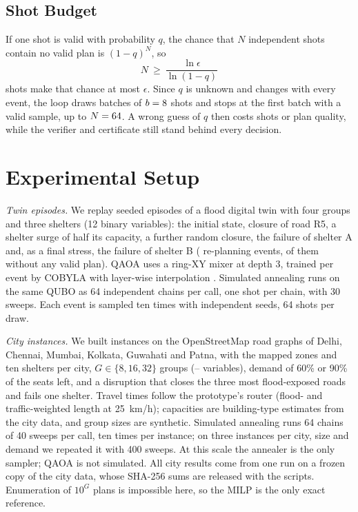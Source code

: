 \documentclass[conference]{IEEEtran}
\begin{document}
\subsection{Shot Budget}
If one shot is valid with probability $q$, the chance that $N$ independent shots contain no valid plan is $(1-q)^N$, so
\begin{equation}
N\ \ge\ \frac{\ln\epsilon}{\ln(1-q)}
\label{eq:shots}
\end{equation}
shots make that chance at most $\epsilon$. Since $q$ is unknown and changes with every event, the loop draws batches of $b=8$ shots and stops at the first batch with a valid sample, up to $N=64$. A wrong guess of $q$ then costs shots or plan quality, while the verifier and certificate still stand behind every decision.

\section{Experimental Setup}
\textit{Twin episodes.} We replay \TwinSeeds{} seeded episodes of a flood digital twin with four groups and three shelters (12 binary variables): the initial state, closure of road R5, a shelter surge of half its capacity, a further random closure, the failure of shelter A and, as a final stress, the failure of shelter B (\TwinEvents{} re-planning events, \TwinInfeasible{} of them without any valid plan). QAOA uses a ring-XY mixer at depth 3, trained per event by COBYLA with layer-wise interpolation \cite{Zhou2020}. Simulated annealing runs on the same QUBO as 64 independent chains per call, one shot per chain, with 30 sweeps. Each event is sampled ten times with independent seeds, 64 shots per draw.

\textit{City instances.} We built \CityN{} instances on the OpenStreetMap road graphs of Delhi, Chennai, Mumbai, Kolkata, Guwahati and Patna, with the mapped zones and ten shelters per city, $G\in\{8,16,32\}$ groups (\CityMinVars--\CityMaxVars{} variables), demand of 60\% or 90\% of the seats left, and a disruption that closes the three most flood-exposed roads and fails one shelter. Travel times follow the prototype's router (flood- and traffic-weighted length at 25~km/h); capacities are building-type estimates from the city data, and group sizes are synthetic. Simulated annealing runs 64 chains of 40 sweeps per call, ten times per instance; on three instances per city, size and demand we repeated it with 400 sweeps. At this scale the annealer is the only sampler; QAOA is not simulated. All city results come from one run on a frozen copy of the city data, whose SHA-256 sums are released with the scripts. Enumeration of $10^{G}$ plans is impossible here, so the MILP is the only exact reference.
\end{document}
